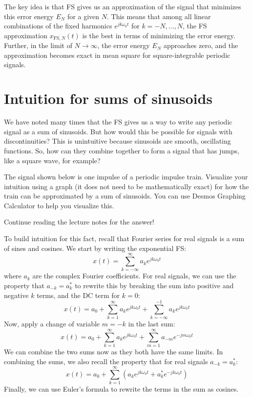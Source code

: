 The key idea is that FS gives us an approximation of the signal that minimizes this error energy \(E_N\) for a given \(N\). This means that among all linear combinations of the fixed harmonics \(e^{jk\omega_0t}\) for \(k=-N,\ldots,N\), the FS approximation \(x_{\text{FS},N}(t)\) is the best in terms of minimizing the error energy. Further, in the limit of \(N \to \infty\), the error energy \(E_N\) approaches zero, and the approximation becomes exact in mean square for square-integrable periodic signals.

\section{Intuition for sums of sinusoids}
We have noted many times that the FS gives us a way to write any periodic signal as a sum of sinusoids. But how would this be possible for signals with discontinuities? This is unintuitive because sinusoids are smooth, oscillating functions. So, how can they combine together to form a signal that has jumps, like a square wave, for example? 
\begin{popquiz}
The signal shown below is one impulse of a periodic impulse train. Visualize
your intuition using a graph (it does not need to be mathematically exact)
for how the train can be approximated by a sum of sinusoids. You can use
Desmos Graphing Calculator to help you visualize this.
\begin{center}

\end{center} 
\popqsplit
Continue reading the lecture notes for the answer!
\end{popquiz}
To build intuition for this fact, recall that Fourier series for real signals is a sum of sines and cosines. We start by writing the exponential FS:
\[
x(t) = \sum_{k=-\infty}^{\infty} a_k e^{j k \omega_0 t}
\]
where \(a_k\) are the complex Fourier coefficients. For real signals, we can use the property that \(a_{-k} = a_k^*\) to rewrite this by breaking the sum into positive and negative \(k\) terms, and the DC term for \(k=0\):
\[
x(t) = a_0 + \sum_{k=1}^{\infty} a_k e^{j k \omega_0 t} + \sum_{k=-\infty}^{-1} a_k e^{j k \omega_0 t}
\]
Now, apply a change of variable \(m = -k\) in the last sum:
\[
x(t) = a_0 + \sum_{k=1}^{\infty} a_k e^{j k \omega_0 t} + \sum_{m=1}^{\infty} a_{-m} e^{-j m \omega_0 t}
\]
We can combine the two sums now as they both have the same limits. In combining the sums, we also recall the property that for real signals \(a_{-k} = a_k^*\):
\[
x(t) = a_0 + \sum_{k=1}^{\infty} \left( a_k e^{j k \omega_0 t} + a_k^* e^{-j k \omega_0 t} \right)
\]
Finally, we can use Euler's formula to rewrite the terms in the sum as cosines. 

